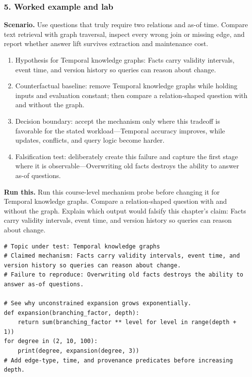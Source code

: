 \subsubsection*{5. Worked example and lab}
\textbf{Scenario.} Use questions that truly require two relations and as-of time. Compare text retrieval with graph traversal, inspect every wrong join or missing edge, and report whether answer lift survives extraction and maintenance cost.
\begin{enumerate}
\item Hypothesis for Temporal knowledge graphs: Facts carry validity intervals, event time, and version history so queries can reason about change.
\item Counterfactual baseline: remove Temporal knowledge graphs while holding inputs and evaluation constant; then compare a relation-shaped question with and without the graph.
\item Decision boundary: accept the mechanism only where this tradeoff is favorable for the stated workload—Temporal accuracy improves, while updates, conflicts, and query logic become harder.
\item Falsification test: deliberately create this failure and capture the first stage where it is observable—Overwriting old facts destroys the ability to answer as-of questions.
\end{enumerate}
\textbf{Run this.} Run this course-level mechanism probe before changing it for Temporal knowledge graphs. Compare a relation-shaped question with and without the graph. Explain which output would falsify this chapter's claim: Facts carry validity intervals, event time, and version history so queries can reason about change.
\begin{Verbatim}[fontsize=\scriptsize]
# Topic under test: Temporal knowledge graphs
# Claimed mechanism: Facts carry validity intervals, event time, and version history so queries can reason about change.
# Failure to reproduce: Overwriting old facts destroys the ability to answer as-of questions.

# See why unconstrained expansion grows exponentially.
def expansion(branching_factor, depth):
    return sum(branching_factor ** level for level in range(depth + 1))
for degree in (2, 10, 100):
    print(degree, expansion(degree, 3))
# Add edge-type, time, and provenance predicates before increasing depth.
\end{Verbatim}
